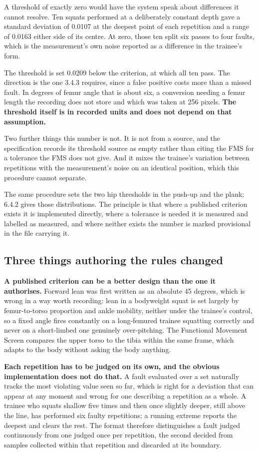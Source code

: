 A threshold of exactly zero would have the system speak about differences it cannot resolve. Ten squats performed at a deliberately constant depth gave a standard deviation of 0.0107 at the deepest point of each repetition and a range of 0.0163 either side of its centre. At zero, those ten split six passes to four faults, which is the measurement's own noise reported as a difference in the trainee's form.

The threshold is set 0.0209 below the criterion, at which all ten pass. The direction is the one 3.4.3 requires, since a false positive costs more than a missed fault. In degrees of femur angle that is about six, a conversion needing a femur length the recording does not store and which was taken at 256 pixels. \textbf{The threshold itself is in recorded units and does not depend on that assumption.}

Two further things this number is not. It is not from a source, and the specification records its threshold source as empty rather than citing the FMS for a tolerance the FMS does not give. And it mixes the trainee's variation between repetitions with the measurement's noise on an identical position, which this procedure cannot separate.

The same procedure sets the two hip thresholds in the push-up and the plank; 6.4.2 gives those distributions. The principle is that where a published criterion exists it is implemented directly, where a tolerance is needed it is measured and labelled as measured, and where neither exists the number is marked provisional in the file carrying it.

\subsection{Three things authoring the rules changed}
\label{sec:4.5.3}

\textbf{A published criterion can be a better design than the one it authorises.} Forward lean was first written as an absolute 45 degrees, which is wrong in a way worth recording: lean in a bodyweight squat is set largely by femur-to-torso proportion and ankle mobility, neither under the trainee's control, so a fixed angle fires constantly on a long-femured trainee squatting correctly and never on a short-limbed one genuinely over-pitching. The Functional Movement Screen compares the upper torso to the tibia within the same frame, which adapts to the body without asking the body anything.

\textbf{Each repetition has to be judged on its own, and the obvious implementation does not do that.} A fault evaluated over a set naturally tracks the most violating value seen so far, which is right for a deviation that can appear at any moment and wrong for one describing a repetition as a whole. A trainee who squats shallow five times and then once slightly deeper, still above the line, has performed six faulty repetitions; a running extreme reports the deepest and clears the rest. The format therefore distinguishes a fault judged continuously from one judged once per repetition, the second decided from samples collected within that repetition and discarded at its boundary.

